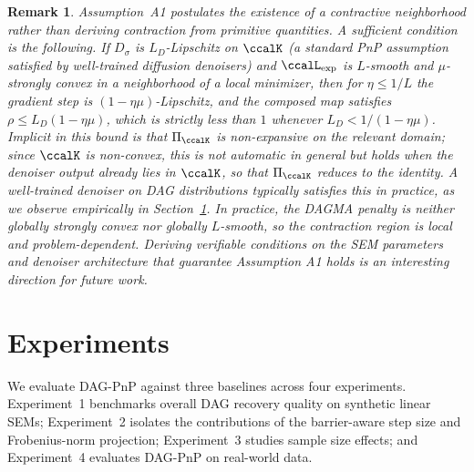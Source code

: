 \documentclass[conference]{IEEEtran}
\newtheorem{remark}{\bf Remark}
\newcommand{\Lext}{\ccalL_{\mathrm{exp}}}
\begin{document}
	\begin{remark}\label{rem:contraction}
		Assumption~A1 postulates the existence of a contractive neighborhood rather than deriving contraction from primitive quantities. A sufficient condition is the following. If $D_\sigma$ is $L_D$-Lipschitz on $\ccalK$ (a standard PnP assumption~\cite{ryu2019plugandplay} satisfied by well-trained diffusion denoisers) and $\Lext$ is $L$-smooth and $\mu$-strongly convex in a neighborhood of a local minimizer, then for $\eta \leq 1/L$ the gradient step is $(1 - \eta\mu)$-Lipschitz, and the composed map satisfies $\rho \leq L_D(1 - \eta\mu)$, which is strictly less than $1$ whenever $L_D < 1/(1 - \eta\mu)$. Implicit in this bound is that $\Pi_{\ccalK}$ is non-expansive on the relevant domain; since $\ccalK$ is non-convex, this is not automatic in general but holds when the denoiser output already lies in $\ccalK$, so that $\Pi_{\ccalK}$ reduces to the identity. A well-trained denoiser on DAG distributions typically satisfies this in practice, as we observe empirically in Section~\ref{sec:experiments}. In practice, the DAGMA penalty is neither \emph{globally} strongly convex nor globally $L$-smooth, so the contraction region is local and problem-dependent. Deriving verifiable conditions on the SEM parameters and denoiser architecture that guarantee Assumption A1 holds is an interesting direction for future work.
	\end{remark}
	
	\section{Experiments}
	\label{sec:experiments}
	
	

    We evaluate DAG-PnP against three baselines across four experiments.
    Experiment~1 benchmarks overall DAG recovery quality on synthetic linear
    SEMs; Experiment~2 isolates the contributions of the barrier-aware step
    size and Frobenius-norm projection; Experiment~3 studies sample size effects; %
    and Experiment~4 evaluates DAG-PnP on real-world data.
    
\end{document}
